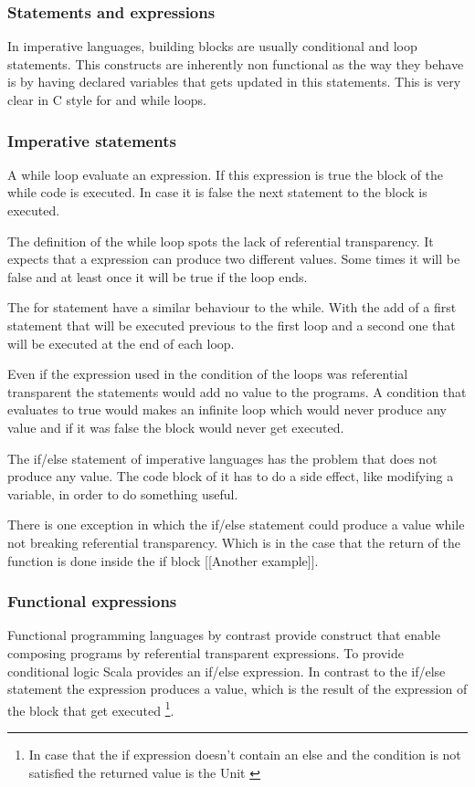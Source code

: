 \documentclass[../main.tex]{subfiles}
\begin{document}
\subsubsection{Statements and expressions}
In imperative languages, building blocks are usually conditional and loop statements. This constructs are inherently non functional as the way they behave is by having declared variables that gets updated in this statements. This is very clear in C style for and while loops. 

\subsubsection{Imperative statements}
A while loop evaluate an expression. If this expression is true the block of the while code is executed. In case it is false the next statement to the block is executed.

The definition of the while loop spots the lack of referential transparency. It expects that a expression can produce two different values. Some times it will be false and at least once it will be true if the loop ends.

The for statement have a similar behaviour to the while. With the add of a first statement that will be executed previous to the first loop and a second one that will be executed at the end of each loop.

Even if the expression used in the condition of the loops was referential transparent the statements would add no value to the programs. A condition that evaluates to true would makes an infinite loop which would never produce any value and if it was false the block would never get executed.

The if/else statement of imperative languages has the problem that does not produce any value. The code block of it has to do a side effect, like modifying a variable, in order to do something useful.

There is one exception in which the if/else statement could produce a value while not breaking referential transparency. Which is in the case that the return of the function is done inside the if block [[Another example]].

\subsubsection{Functional expressions}
Functional programming languages by contrast provide construct that enable composing programs by referential transparent expressions. To provide conditional logic Scala provides an if/else expression. In contrast to the if/else statement the expression produces a value, which is the result of the expression of the block that get executed \footnote{In case that the if expression doesn't contain an else and the condition is not satisfied the returned value is the Unit \autocite{ScalaScala.Unit}}.
\end{document}
